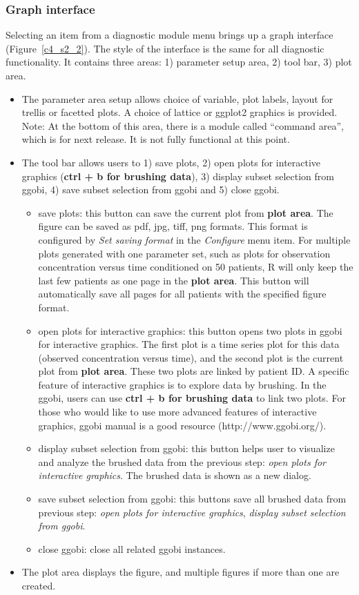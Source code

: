 \documentclass[a4paper]{article}
\begin{document}
\subsubsection{Graph interface}
Selecting an item from a diagnostic module menu brings up a graph interface (Figure~\ref{c4_s2_2}). The style of the interface is the same for all diagnostic functionality.  It contains three areas: 1) parameter setup area, 2) tool bar, 3) plot area.
\newline
\newline
\begin{itemize}
	\item The parameter area setup allows choice of variable, plot labels, layout for trellis or facetted plots. A choice of lattice or ggplot2 graphics is provided.  Note: At the bottom of this area, there is a module called ``command area'', which is for next release. It is not fully functional at this point.
	\item The tool bar allows users to 1) save plots, 2) open plots for interactive graphics (\textbf{ctrl + b for brushing data}), 3) display subset selection from ggobi, 4) save subset selection from ggobi and 5) close ggobi.
		\begin{itemize}
			\item save plots: this button can save the current plot from \textbf{plot area}. The figure can be saved as pdf, jpg, tiff, png formats. This format is configured by \textit{Set saving format} in the \textit{Configure} menu item. For multiple plots generated with one parameter set, such as plots for observation concentration versus time conditioned on 50 patients, R will only keep the last few patients as one page in the \textbf{plot area}. This button will automatically save all pages for all patients with the specified figure format.
			\item open plots for interactive graphics: this button opens two plots in ggobi for interactive graphics. The first plot is a time series plot for this data (observed concentration versus time), and the second plot is the current plot from \textbf{plot area}. These two plots are linked by patient ID. A specific feature of interactive graphics is to explore data by brushing. In the ggobi, users can use \textbf{ctrl + b for brushing data} to link two plots. For those who would like to use more advanced features of interactive graphics, ggobi manual is a good resource (http://www.ggobi.org/).
			\item display subset selection from ggobi: this button helps user to visualize and analyze the brushed data from the previous step: \textit{ open plots for interactive graphics}. The brushed data is shown as a new dialog.
			\item save subset selection from ggobi: this buttons save all brushed data from previous step: \textit{open plots for interactive graphics}, \textit{ display subset selection from ggobi}. 
			\item close ggobi: close all related ggobi instances.
		\end{itemize}
	\item The plot area displays the figure, and multiple figures if more than one are created.
\end{itemize}
\end{document}
